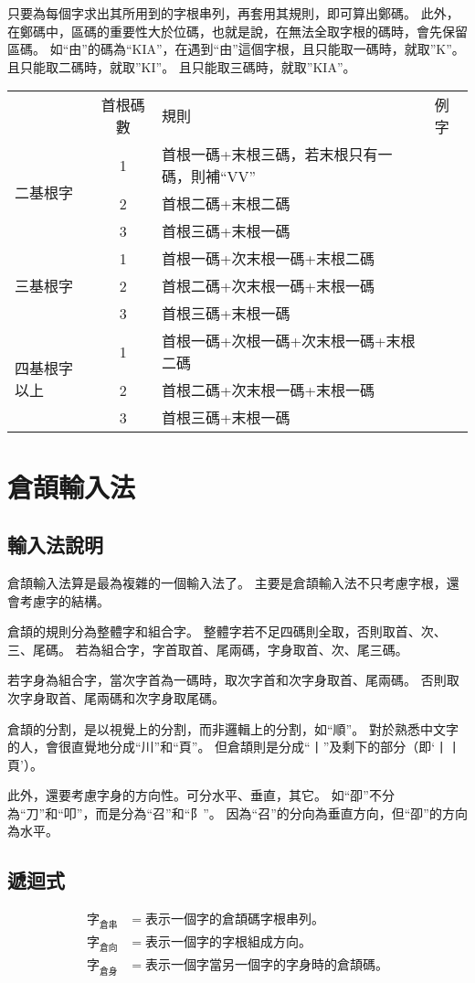\documentclass{article}
\begin{document}
只要為每個字求出其所用到的字根串列，再套用其規則，即可算出鄭碼。
此外，在鄭碼中，區碼的重要性大於位碼，也就是說，在無法全取字根的碼時，會先保留區碼。
如``由''的碼為``KIA''，在遇到``由''這個字根，且只能取一碼時，就取''K''。
且只能取二碼時，就取''KI''。
且只能取三碼時，就取''KIA''。

\begin{tabular}{lcll}
           & 首根碼數 & 規則 & 例字\\
  \multirow{3}{*}{二基根字} & 1 & 首根一碼+末根三碼，若末根只有一碼，則補``VV''\\
  & 2 & 首根二碼+末根二碼\\
  & 3 & 首根三碼+末根一碼\\
  \multirow{3}{*}{三基根字} & 1 & 首根一碼+次末根一碼+末根二碼\\
  & 2 & 首根二碼+次末根一碼+末根一碼\\
  & 3 & 首根三碼+末根一碼\\
  \multirow{4}{*}{四基根字以上} & 1 & 首根一碼+次根一碼+次末根一碼+末根二碼\\
  & 2 & 首根二碼+次末根一碼+末根一碼\\
  & 3 & 首根三碼+末根一碼\\
\end{tabular}

\section{倉頡輸入法}
\subsection{輸入法說明}
倉頡輸入法算是最為複雜的一個輸入法了。
主要是倉頡輸入法不只考慮字根，還會考慮字的結構。

倉頡的規則分為整體字和組合字。
整體字若不足四碼則全取，否則取首、次、三、尾碼。
若為組合字，字首取首、尾兩碼，字身取首、次、尾三碼。

若字身為組合字，當次字首為一碼時，取次字首和次字身取首、尾兩碼。
否則取次字身取首、尾兩碼和次字身取尾碼。

倉頡的分割，是以視覺上的分割，而非邏輯上的分割，如``順''。
對於熟悉中文字的人，會很直覺地分成``川''和``頁''。
但倉頡則是分成``丨''及剩下的部分（即`丨丨頁'）。

此外，還要考慮字身的方向性。可分水平、垂直，其它。
如``卲''不分為``刀''和``叩''，而是分為``召''和``阝''。
因為``召''的分向為垂直方向，但``卲''的方向為水平。

\subsection{遞迴式}
\begin{subequations}
  \begin{align}
    \mbox{字}_{\mbox{倉串}} &= 表示一個字的倉頡碼字根串列。\\
    \mbox{字}_{\mbox{倉向}} &= 表示一個字的字根組成方向。\\
    \mbox{字}_{\mbox{倉身}} &= 表示一個字當另一個字的字身時的倉頡碼。\\
  \end{align}
\end{subequations}
\end{document}
